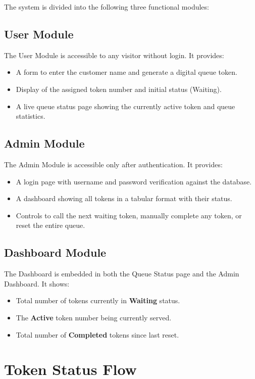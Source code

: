 The system is divided into the following three functional modules:

\subsection{User Module}

The User Module is accessible to any visitor without login. It provides:
\begin{itemize}
    \item A form to enter the customer name and generate a digital queue token.
    \item Display of the assigned token number and initial status (Waiting).
    \item A live queue status page showing the currently active token and queue statistics.
\end{itemize}

\subsection{Admin Module}

The Admin Module is accessible only after authentication. It provides:
\begin{itemize}
    \item A login page with username and password verification against the database.
    \item A dashboard showing all tokens in a tabular format with their status.
    \item Controls to call the next waiting token, manually complete any token, or reset the entire queue.
\end{itemize}

\subsection{Dashboard Module}

The Dashboard is embedded in both the Queue Status page and the Admin Dashboard. It shows:
\begin{itemize}
    \item Total number of tokens currently in \textbf{Waiting} status.
    \item The \textbf{Active} token number being currently served.
    \item Total number of \textbf{Completed} tokens since last reset.
\end{itemize}

\section{Token Status Flow}

